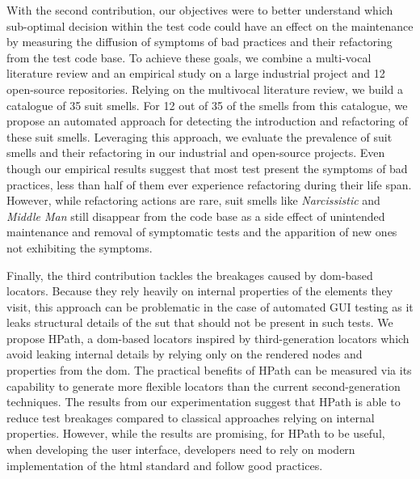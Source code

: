 
With the second contribution, our objectives were to better understand which sub-optimal decision within the test code could have an effect on the maintenance by measuring the diffusion of symptoms of bad practices and their refactoring from the test code base. To achieve these goals, we combine a multi-vocal literature review and an empirical study on a large industrial project and 12 open-source repositories.
Relying on the multivocal literature review, we build a catalogue of 35 \gls{suit} smells. For 12 out of 35 of the smells from this catalogue, we propose an automated approach for detecting the introduction and refactoring of these \gls{suit} smells. Leveraging this  approach, we evaluate the prevalence of \gls{suit} smells and their refactoring in our industrial and open-source projects. Even though our empirical results suggest that most test present the symptoms of bad practices, less than half of them ever experience refactoring during their life span. However, while refactoring actions are rare, \gls{suit} smells like \emph{Narcissistic} and \emph{Middle Man} still disappear from the code base as a side effect of unintended maintenance and removal of symptomatic tests and the apparition of new ones not exhibiting the symptoms.

Finally, the third contribution tackles the breakages caused by \gls{dom}-based locators. Because they rely heavily on internal properties of the elements they visit, this approach can be problematic in the case of automated GUI testing as it leaks structural details of the \gls{sut} that should not be present in such tests. We propose HPath, a \gls{dom}-based locators inspired by third-generation locators which avoid leaking internal details by relying only on the rendered nodes and properties from the \gls{dom}. The practical benefits of HPath can be measured via its capability to generate more flexible locators than the current second-generation techniques. The results from our experimentation suggest that HPath is able to reduce test breakages compared to classical approaches relying on internal properties. However, while the results are promising, for HPath to be useful, when developing the user interface, developers need to rely on modern implementation of the \gls{html} standard and follow good practices.

